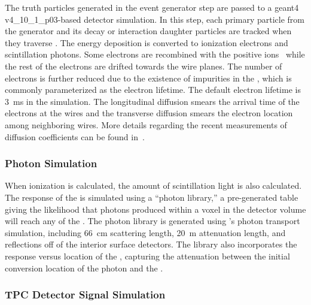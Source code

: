 The truth particles generated in the event generator step are passed to a {\sc geant4} v4\_10\_1\_p03-based detector simulation. In this step, each primary particle from the generator and its decay or interaction daughter particles are tracked when they traverse \lar. The energy deposition is converted to ionization electrons and scintillation photons. Some electrons are recombined with the positive ions~\cite{Acciarri:2013met,Amoruso:2004dy} while the rest of the electrons are drifted towards the wire planes. The number of electrons is further reduced due to the existence of impurities in the \lar, which is commonly parameterized as the electron lifetime. The default electron lifetime is \SI{3}{ms} in the simulation. The longitudinal diffusion smears the arrival time of the electrons at the wires and the transverse diffusion smears the electron location among neighboring wires. More details
regarding the recent measurements of diffusion coefficients can be found
in~\cite{Li:2015rqa,larpropertiesbnl}.

\subsubsection{Photon Simulation}

When ionization is calculated, the amount of scintillation light is also calculated. The response of the  is simulated using a ``photon library,'' a pre-generated table giving the likelihood that photons produced within a voxel in the detector volume  will reach any of the . The photon library is generated using 's photon transport simulation, including \SI{66}{cm} scattering length, \SI{20}{m} attenuation length, and reflections off of the interior surface detectors. The library also incorporates the response versus location of the , capturing the attenuation between the initial conversion location of the photon and the .

\subsubsection{TPC Detector Signal Simulation}\label{sec:tpc_sim}

